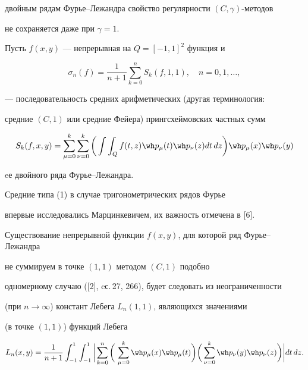 двойным рядам Фурье--Лежандра свойство регулярности $(C,\gamma)$-методов


не сохраняется даже при $\gamma=1$.





Пусть $f(x,y)$ --- непрерывная на $Q=[-1,1]^2$ функция и


\begin{equation}


\sigma_n(f)=\frac {1}{n+1}\sum_{k=0}^n S_k(f,1,1),\quad n=0,1,\dotsc,


\end{equation}


--- последовательность средних арифметических (другая терминология:


средние $(C,1)$ или средние Фейера) прингсхеймовских частных сумм


$$


S_k(f,x,y)=\sum_{\mu=0}^k \sum_{\nu=0}^k


\bigg(\int \int_Q f(t,z) \wh p_{\mu}(t)\wh p_{\nu}(z) dt \,dz\bigg)


\wh p_{\mu}(x) \wh p_{\nu}(y)


$$


eе двойного ряда Фурье--Лежандра.





Средние типа (1) в случае тригонометрических рядов Фурье


впервые исследовались Марцинкевичем, их важность отмечена в [6].





Существование непрерывной функции $f(x,y)$, для которой ряд Фурье--Лежандра


не суммируем в точке $(1,1)$ методом $(C,1)$ подобно


одномерному случаю ([2], cс.\,27, 266), будет следовать из неограниченности


(при $n\to \infty$) констант Лебега $L_n(1,1)$, являющихся значениями


(в точке $(1,1)$) функций Лебега


\begin{equation}


L_n(x,y)= \frac {1}{n+1}\int_{-1}^1 \int_{-1}^1 \bigg|


\sum_{k=0}^n\bigg(\,\sum_{\mu=0}^k


\wh p_{\mu}(x) \wh p_{\mu}(t)\bigg) \bigg(\sum_{\nu=0}^k


\wh p_{\nu}(y) \wh p_{\nu}(z)\bigg)\bigg|dt\,dz.


\end{equation}






